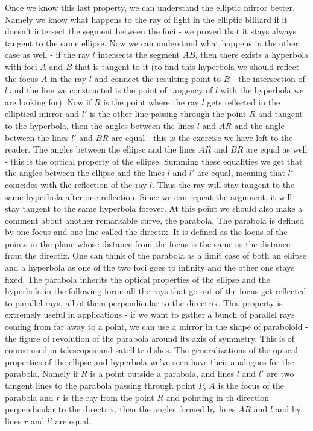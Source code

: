 Once we know this last property, we can understand the elliptic mirror better. Namely we know what happens to the ray of light in the elliptic billiard if it doesn't intersect the segment between the foci - we proved that it stays always tangent to the same ellipse. Now we can understand what happens in the other case as well - if the ray $l$ intersects the segment $AB$, then there exists a hyperbola with foci $A$ and $B$ that is tangent to it (to find this hyperbola we should reflect the focus $A$ in the ray $l$ and connect the resulting point to $B$ - the intersection of $l$ and the line we constructed is the point of tangency of $l$ with the hyperbola we are looking for).
Now if $R$ is the point where the ray $l$ gets reflected in the elliptical mirror and $l'$ is the other line passing through the point $R$ and tangent to the hyperbola, then the angles between the lines $l$ and $AR$ and the angle between the lines $l'$ and $BR$ are equal - this is the exercise we have left to the reader. The angles between the ellipse and the lines $AR$ and $BR$ are equal as well - this is the optical property of the ellipse. Summing these equalities we get that the angles between the ellipse and the lines $l$ and $l'$ are equal, meaning that $l'$ coincides with the reflection of the ray $l$. Thus the ray will stay tangent to the same hyperbola after one reflection. Since we can repeat the argument, it will stay tangent to the same hyperbola forever.
At this point we should also make a comment about another remarkable curve, the parabola. The parabola is defined by one focus and one line called the directix. It is defined as the locus of the points in the plane whose distance from the focus is the same as the distance from the directix.
One can think of the parabola as a limit case of both an ellipse and a hyperbola as one of the two foci goes to infinity and the other one stays fixed. The parabola inherits the optical properties of the ellipse and the hyperbola in the following form: all the rays that go out of the focus get reflected to parallel rays, all of them perpendicular to the directrix. This property is extremely useful in applications - if we want to gather a bunch of parallel rays coming from far away to a point, we can use a mirror in the shape of paraboloid - the figure of revolution of the parabola around its axis of symmetry. This is of course used in telescopes and satellite dishes.
The generalizations of the optical properties of the ellipse and hyperbola we've seen have their analogues for the parabola. Namely if $R$ is a point outside a parabola, and lines $l$ and $l'$ are two tangent lines to the parabola passing through point $P$, $A$ is the focus of the parabola and $r$ is the ray from the point $R$ and pointing in th direction perpendicular to the directrix, then the angles formed by lines $AR$ and $l$ and by lines $r$ and $l'$ are equal.
